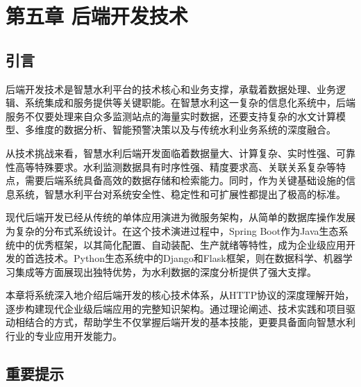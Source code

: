 \hypertarget{ux7b2cux4e94ux7ae0-ux540eux7aefux5f00ux53d1ux6280ux672f}{%
\section{第五章 后端开发技术}\label{ux7b2cux4e94ux7ae0-ux540eux7aefux5f00ux53d1ux6280ux672f}}


\hypertarget{ux5f15ux8a00}{%
\subsection{引言}\label{ux5f15ux8a00}}

后端开发技术是智慧水利平台的技术核心和业务支撑，承载着数据处理、业务逻辑、系统集成和服务提供等关键职能。在智慧水利这一复杂的信息化系统中，后端服务不仅要处理来自众多监测站点的海量实时数据，还要支持复杂的水文计算模型、多维度的数据分析、智能预警决策以及与传统水利业务系统的深度融合。

从技术挑战来看，智慧水利后端开发面临着数据量大、计算复杂、实时性强、可靠性高等特殊要求。水利监测数据具有时序性强、精度要求高、关联关系复杂等特点，需要后端系统具备高效的数据存储和检索能力。同时，作为关键基础设施的信息系统，智慧水利平台对系统安全性、稳定性和可扩展性都提出了极高的标准。

现代后端开发已经从传统的单体应用演进为微服务架构，从简单的数据库操作发展为复杂的分布式系统设计。在这个技术演进过程中，Spring Boot作为Java生态系统中的优秀框架，以其简化配置、自动装配、生产就绪等特性，成为企业级应用开发的首选技术。Python生态系统中的Django和Flask框架，则在数据科学、机器学习集成等方面展现出独特优势，为水利数据的深度分析提供了强大支撑。

本章将系统深入地介绍后端开发的核心技术体系，从HTTP协议的深度理解开始，逐步构建现代企业级后端应用的完整知识架构。通过理论阐述、技术实践和项目驱动相结合的方式，帮助学生不仅掌握后端开发的基本技能，更要具备面向智慧水利行业的专业应用开发能力。

\hypertarget{ux91cdux8981ux63d0ux793a}{%
\subsection{重要提示}\label{ux91cdux8981ux63d0ux793a}}

